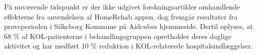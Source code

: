 På nuværende tidspunkt er der ikke udgivet forskningsartikler omhandlende effekterne fra anvendelsen af HomeRehab appen, dog fremgår resultater fra prøveperioden i Silkeborg Kommune på Aidcubes hjemmeside. Dertil oplyses, at 68 \% af KOL-patienterne i behandlingsgruppen opretholder deres daglige aktivitet og har medført 10 \% reduktion i KOL-relaterede hospitalsindlæggelser.\cite{AidCube2017}
